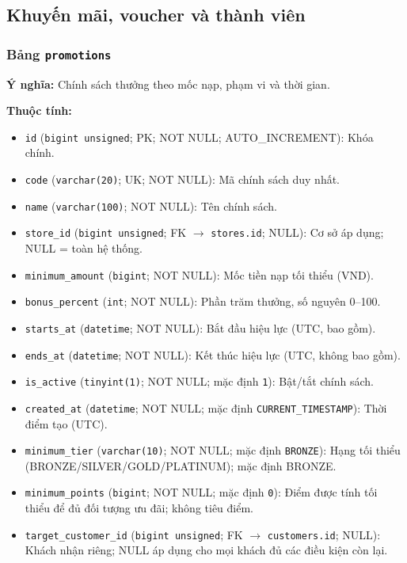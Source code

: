 \subsection{Khuyến mãi, voucher và thành viên}

\subsubsection{Bảng \texttt{promotions}}

\textbf{Ý nghĩa:} Chính sách thưởng theo mốc nạp, phạm vi và thời gian.\par

\textbf{Thuộc tính:}

\begin{itemize}

\item \texttt{id} (\texttt{bigint unsigned}; PK; NOT NULL; AUTO_INCREMENT): Khóa chính.

\item \texttt{code} (\texttt{varchar(20)}; UK; NOT NULL): Mã chính sách duy nhất.

\item \texttt{name} (\texttt{varchar(100)}; NOT NULL): Tên chính sách.

\item \texttt{store\_id} (\texttt{bigint unsigned}; FK $\rightarrow$ \texttt{stores.id}; NULL): Cơ sở áp dụng; NULL = toàn hệ thống.

\item \texttt{minimum\_amount} (\texttt{bigint}; NOT NULL): Mốc tiền nạp tối thiểu (VND).

\item \texttt{bonus\_percent} (\texttt{int}; NOT NULL): Phần trăm thưởng, số nguyên 0–100.

\item \texttt{starts\_at} (\texttt{datetime}; NOT NULL): Bắt đầu hiệu lực (UTC, bao gồm).

\item \texttt{ends\_at} (\texttt{datetime}; NOT NULL): Kết thúc hiệu lực (UTC, không bao gồm).

\item \texttt{is\_active} (\texttt{tinyint(1)}; NOT NULL; mặc định \texttt{1}): Bật/tắt chính sách.

\item \texttt{created\_at} (\texttt{datetime}; NOT NULL; mặc định \texttt{CURRENT\_TIMESTAMP}): Thời điểm tạo (UTC).

\item \texttt{minimum\_tier} (\texttt{varchar(10)}; NOT NULL; mặc định \texttt{BRONZE}): Hạng tối thiểu (BRONZE/SILVER/GOLD/PLATINUM); mặc định BRONZE.

\item \texttt{minimum\_points} (\texttt{bigint}; NOT NULL; mặc định \texttt{0}): Điểm được tính tối thiểu để đủ đối tượng ưu đãi; không tiêu điểm.

\item \texttt{target\_customer\_id} (\texttt{bigint unsigned}; FK $\rightarrow$ \texttt{customers.id}; NULL): Khách nhận riêng; NULL áp dụng cho mọi khách đủ các điều kiện còn lại.

\end{itemize}

